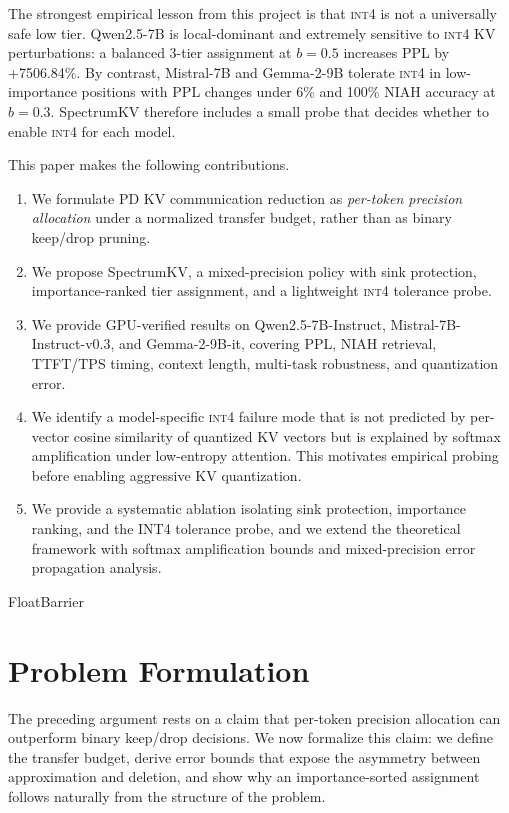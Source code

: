 \documentclass[11pt]{article}
\newcommand{\method}{SpectrumKV}
\newcommand{\niah}{NIAH}
\newcommand{\budget}{b}
\newcommand{\pct}{\%}
\newcommand{\intiv}{\textsc{int4}}
\theoremstyle{plain}
\theoremstyle{definition}
\begin{document}
The strongest empirical lesson from this project is that \intiv{} is not a universally safe low tier.  Qwen2.5-7B is local-dominant and extremely sensitive to \intiv{} KV perturbations: a balanced 3-tier assignment at $\budget=0.5$ increases PPL by +7506.84\pct{}.  By contrast, Mistral-7B and Gemma-2-9B tolerate \intiv{} in low-importance positions with PPL changes under 6\% and 100\% \niah{} accuracy at $\budget=0.3$.  \method{} therefore includes a small probe that decides whether to enable \intiv{} for each model.

This paper makes the following contributions.
\begin{enumerate}[leftmargin=1.6em,itemsep=2pt]
    \item We formulate PD KV communication reduction as \emph{per-token precision allocation} under a normalized transfer budget, rather than as binary keep/drop pruning.
    \item We propose \method{}, a mixed-precision policy with sink protection, importance-ranked tier assignment, and a lightweight \intiv{} tolerance probe.
    \item We provide GPU-verified results on Qwen2.5-7B-Instruct, Mistral-7B-Instruct-v0.3, and Gemma-2-9B-it, covering PPL, \niah{} retrieval, TTFT/TPS timing, context length, multi-task robustness, and quantization error.
    \item We identify a model-specific \intiv{} failure mode that is not predicted by per-vector cosine similarity of quantized KV vectors but is explained by softmax amplification under low-entropy attention.  This motivates empirical probing before enabling aggressive KV quantization.
    \item We provide a systematic ablation isolating sink protection, importance ranking, and the INT4 tolerance probe, and we extend the theoretical framework with softmax amplification bounds and mixed-precision error propagation analysis.
\end{enumerate}

FloatBarrier
\section{Problem Formulation}
\label{sec:formulation}

The preceding argument rests on a claim that per-token precision allocation can outperform binary keep/drop decisions.  We now formalize this claim: we define the transfer budget, derive error bounds that expose the asymmetry between approximation and deletion, and show why an importance-sorted assignment follows naturally from the structure of the problem.
\end{document}
